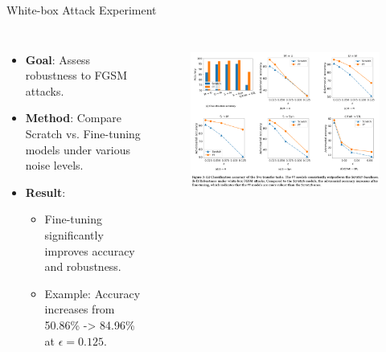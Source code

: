 \begin{frame}{White-box Attack Experiment}
\begin{columns}[T]
        \begin{itemize}
            \item \textbf{Goal}: Assess robustness to FGSM attacks.
            \item \textbf{Method}: Compare Scratch vs. Fine-tuning models under various noise levels.
            \item \textbf{Result}:
            \begin{itemize}
                \item Fine-tuning significantly improves accuracy and robustness.
                \item Example: Accuracy increases from 50.86\% -> 84.96\% at $\epsilon = 0.125$.
            \end{itemize}
        \end{itemize}

       \begin{figure}[h]
           \centering
           \includegraphics[scale=0.7]{img/white-box.png}
           \label{fig:what-is}
       \end{figure}
    \end{columns}
\end{frame}
